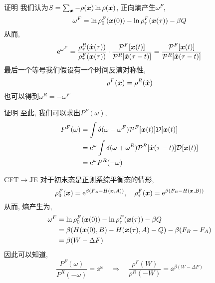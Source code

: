     \begin{frame}{证明}
        我们认为$S = \sum_{\vb*x} - \rho(\vb*x)\ln\rho(\vb*x)$, 
        正向熵产生$\omega^F$, 
        \begin{equation}
            \omega^F = \ln\rho^F_0(\vb*x(0)) - \ln\rho^F_\tau(\vb*x(\tau)) - \beta Q
        \end{equation}
        从而,
        \begin{equation}
            \mathrm{e}^{\omega^F} = \frac{\rho^R_\tau(\hat{\vb*x}(\tau))}{\rho^F_\tau(\vb*x(\tau))}\cdot\frac{\mathcal{P}^F[\vb*x(t)]}{\mathcal{P}^R[\hat{\vb*x}(\tau-t)]} = \frac{\mathcal{P}^F[\vb*x(t)]}{\mathcal{P}^R[\hat{\vb*x}(\tau-t)]}
        \end{equation}
        最后一个等号我们假设有一个时间反演对称性,
        \begin{equation}
            \rho^F(\vb*x) = \rho^R(\hat{\vb*x})
        \end{equation}
        也可以得到$\omega^R = -\omega^F$
    \end{frame}
    \begin{frame}{证明}
        至此, 我们可以求出$P^F(\omega)$,
        \begin{equation}
            \begin{split}
                P^F(\omega) &= \int\delta(\omega-\omega^F) \mathcal P^F[\vb*x(t)]\mathcal D[\vb*x(t)]\\
                &= \mathrm{e}^{\omega}\int\delta(\omega+\omega^R)\mathcal{P}^R[\hat{\vb*x}(\tau-t)]\mathcal D[\vb*x(t)]\\
                &= \mathrm{e}^{\omega}P^R(-\omega)
            \end{split}
        \end{equation}
    \end{frame}
    \begin{frame}{CFT$\to$JE}
        对于初末态是正则系综平衡态的情形,
        \begin{equation}
            \rho^F_0(\vb*x) = \mathrm{e}^{\beta(F_A - H(\vb*x,A))},\quad \rho^F_\tau(\vb*x) = \mathrm{e}^{\beta(F_B - H(\vb*x,B))}
        \end{equation}
        从而, 熵产生为,
        \begin{equation}
            \begin{split}
                \omega^F &= \ln\rho^F_0(\vb*x(0)) - \ln\rho^F_\tau(\vb*x(\tau)) - \beta Q \\
                &=\beta(H(\vb*x(0),B) - H(\vb*x(\tau),A)-Q) - \beta(F_B-F_A) \\
                &= \beta(W-\Delta F)              
            \end{split}
        \end{equation}
        因此可以知道,
        \begin{equation}
            \frac{P^F(\omega)}{P^R(-\omega)} = \ee^{\omega}\quad\Rightarrow\quad \frac{\rho^F(W)}{\rho^R(-W)} = \ee^{\beta(W - \Delta F)}
        \end{equation}
    \end{frame}
